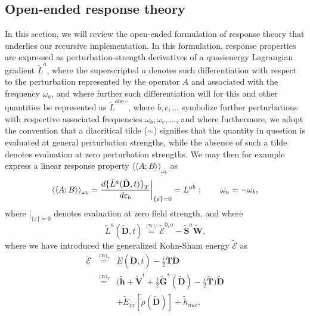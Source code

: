 \documentclass[%
 reprint,
 amsmath,amssymb,
 aps,
]{revtex4-1}
\begin{document}
\subsection{Open-ended response theory}
\label{rsp_theory}

In this section, we will review the open-ended formulation of response theory
that underlies our recursive implementation. In this formulation, response
properties are expressed as perturbation-strength derivatives of a quasienergy
Lagrangian gradient $\tilde{L}^a$, where the superscripted $a$ denotes such
differentiation with respect to the perturbation represented by the operator
$A$ and associated with the frequency $\omega_{a}$, and where further such
differentiation will for this and other quantities be represented as
$\tilde{L}^{abc\cdots}$, where $b, c, \ldots$ symbolize further perturbations
with respective associated frequencies $\omega_{b}, \omega_{c}, \ldots$, and
where furthermore, we adopt the convention that a diacritical tilde ($\sim$)
signifies that the quantity in question is evaluated at general perturbation
strengths, while the absence of such a tilde denotes evaluation at zero
perturbation strengths. We may then for example express a linear response
property $\langle \langle A ; B \rangle \rangle_{\omega_{b}}$ as
\begin{equation}
\label{LRF-D}
\langle \langle A ; B \rangle \rangle_{\omega_{b}} =
\frac{d { \{ \tilde{L}^a (\tilde{\mathbf{D}}, t) \} }_T }
{d\varepsilon_b} \biggr{\vert}_{
\{ \varepsilon \} = 0 } = L^{ab} \text{ ; } \qquad
\omega_a = -\omega_{b}\text{,}
\end{equation}
where $\vert_{ \{ \varepsilon \} = 0 }$ denotes evaluation at zero field strength, and where
\begin{equation}\label{La}
\tilde{L}^a (\tilde{\mathbf{D}}, t) \stackrel{\,^{\{\mathrm{Tr}\}_T}}{=}
\tilde{\mathcal{E}}^{0, a} - \tilde{\mathbf{S}}^a \tilde{\mathbf{W}}\text{,}
\end{equation}
where we have introduced the generalized Kohn-Sham energy $\tilde{\mathcal{E}}$ as
\begin{eqnarray}\nonumber
\tilde{\mathcal{E}} &\stackrel{\,^{\{\mathrm{Tr}\}_T}}{=}&
\tilde{E}(\tilde{\mathbf{D}}, t) -
{\textstyle \frac{i}{2}} \tilde{\mathbf{T}} \tilde{\mathbf{D}} \\ \label{G-EKS} &\stackrel{\,^{\{\mathrm{Tr}\}_T}}{=}&
 \bigl( \tilde{\mathbf{h}} + \tilde{\mathbf{V}}^t +
{\textstyle \frac{1}{2}}
\tilde{\mathbf{G}}^{\gamma}(\tilde{\mathbf{D}})
 - {\textstyle \frac{i}{2}} \tilde{\mathbf{T}} \bigr) \tilde{\mathbf{D}} \\
\nonumber && + \tilde{E}_{xc}[\tilde{\rho}(\tilde{\mathbf{D}})]
+ \tilde{h}_{nuc}\text{,}
\end{eqnarray}
\end{document}
